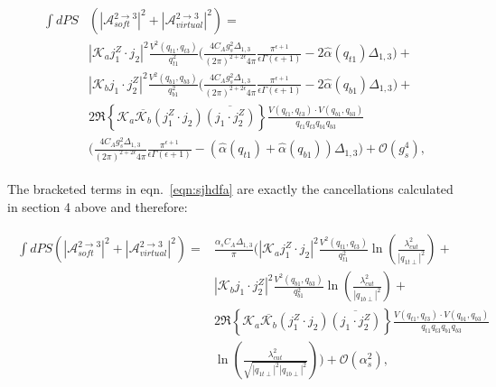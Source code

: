 		\begin{align}
		\begin{split}
			\int dPS&\left(|\mathcal{A}^{2\rightarrow3}_{soft}|^2 + |\mathcal{A}^{2\rightarrow3}_{virtual}|^2\right) =\\
			&|\mathcal{K}_aj_1^Z\cdot j_2|^2 \frac{V^2(q_{t1}, q_{t3})}{q_{t1}^2}
			{\Bigg(\frac{4C_Ag_s^2\Delta_{1,3}}{(2\pi)^{2+2\epsilon}4\pi}\frac{\pi^{\epsilon+1}}
			{\epsilon\Gamma(\epsilon+1)} - 2\hat{\alpha}(q_{t1})\Delta_{1,3}\Bigg)} + \\
			& |\mathcal{K}_bj_1\cdot j_2^Z|^2 \frac{V^2(q_{b1}, q_{b3})}{q_{b1}^2}
			{\Bigg(\frac{4C_Ag_s^2\Delta_{1,3}}{(2\pi)^{2+2\epsilon}4\pi}\frac{\pi^{\epsilon+1}}
			{\epsilon\Gamma(\epsilon+1)} - 2\hat{\alpha}(q_{b1})\Delta_{1,3}\Bigg)}+ \\
			&2\Re\left\{\mathcal{K}_a\overline{\mathcal{K}_b}  (j_1^Z\cdot j_2)\overline{(j_1\cdot j_2^Z)}\right\}
			\frac{V(q_{t1}, q_{t3})\cdot V(q_{b1}, q_{b3})}{q_{t1}q_{t3}q_{b1}q_{b3}}\\
			&{\Bigg(\frac{4C_Ag_s^2\Delta_{1,3}}{(2\pi)^{2+2\epsilon}4\pi}\frac{\pi^{\epsilon+1}}{\epsilon\Gamma(\epsilon+1)} -
			(\hat{\alpha}(q_{t1}) + \hat{\alpha}(q_{b1}))\Delta_{1,3}\Bigg)} + \mathcal{O}(g_s^4),
			\label{eqn:sjhdfa}
		\end{split}
		\end{align}

		The bracketed terms in eqn.~\eqref{eqn:sjhdfa} are exactly the cancellations calculated in section 4 above and therefore:

		\begin{align}
		\begin{split}
			\int dPS\left(|\mathcal{A}^{2\rightarrow3}_{soft}|^2 + |\mathcal{A}^{2\rightarrow3}_{virtual}|^2\right) =&
			\frac{\alpha_sC_A\Delta_{1,3}}{\pi}\Bigg(|\mathcal{K}_aj_1^Z\cdot j_2|^2 \frac{V^2(q_{t1},
			q_{t3})}{q_{t1}^2}\ln\left(\frac{\lambda_{cut}^2}{|q_{1t\perp}|^2}\right)+ \\
			& |\mathcal{K}_bj_1\cdot j_2^Z|^2 \frac{V^2(q_{b1}, q_{b3})}{q_{b1}^2}\ln
			\left(\frac{\lambda_{cut}^2}{|q_{1b\perp}|^2}\right)+ \\
			&2\Re\left\{\mathcal{K}_a\overline{\mathcal{K}_b}  (j_1^Z\cdot j_2)\overline{(j_1\cdot j_2^Z)}\right\}
			\frac{V(q_{t1}, q_{t3})\cdot V(q_{b1}, q_{b3})}{q_{t1}q_{t3}q_{b1}q_{b3}}\\
			&\ln\left(\frac{\lambda_{cut}^2}{\sqrt{|q_{1t\perp}|^2|q_{1b\perp}|^2}}\right)\Bigg) + \mathcal{O}(\alpha_s^2),
		\end{split}
		\end{align}

